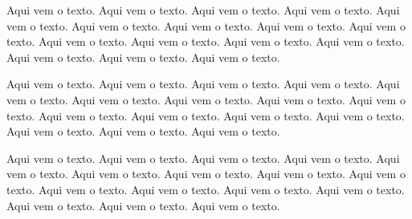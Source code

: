 \documentclass[a4paper, 12pt]{article}
\begin{document}
Aqui vem o texto. Aqui vem o texto. Aqui vem o texto. Aqui vem o texto.
Aqui vem o texto. Aqui vem o texto. Aqui vem o texto. Aqui vem o texto.
Aqui vem o texto. Aqui vem o texto. Aqui vem o texto. Aqui vem o texto.
Aqui vem o texto. Aqui vem o texto. Aqui vem o texto. Aqui vem o texto.

Aqui vem o texto. Aqui vem o texto. Aqui vem o texto. Aqui vem o texto.
Aqui vem o texto. Aqui vem o texto. Aqui vem o texto. Aqui vem o texto.
Aqui vem o texto. Aqui vem o texto. Aqui vem o texto. Aqui vem o texto.
Aqui vem o texto. Aqui vem o texto. Aqui vem o texto. Aqui vem o texto.

Aqui vem o texto. Aqui vem o texto. Aqui vem o texto. Aqui vem o texto.
Aqui vem o texto. Aqui vem o texto. Aqui vem o texto. Aqui vem o texto.
Aqui vem o texto. Aqui vem o texto. Aqui vem o texto. Aqui vem o texto.
Aqui vem o texto. Aqui vem o texto. Aqui vem o texto. Aqui vem o texto.

\newpage


\end{document}
